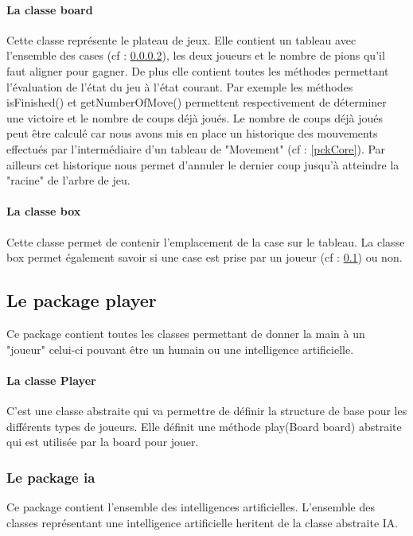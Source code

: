 \documentclass{report}
\begin{document}
                		\paragraph{La classe board}\label{classeBoard}
               			 Cette classe représente le plateau de jeux. Elle contient un tableau avec l'ensemble des cases (cf : \ref{classBox}), les deux joueurs et le nombre de pions qu'il faut aligner pour gagner.
               			 De plus elle contient toutes les méthodes permettant l'évaluation de l'état du jeu à l'état courant. Par exemple les méthodes isFinished() et getNumberOfMove() permettent respectivement de
               			 déterminer une victoire et le nombre de coups déjà joués. Le nombre de coups déjà joués peut être calculé car nous avons mis en place un historique des mouvements effectués
               			 par l'intermédiaire d'un tableau de "Movement" (cf : \ref{pckCore}).
               			 Par ailleurs cet historique nous permet d'annuler le dernier coup jusqu'à atteindre la "racine" de l'arbre de jeu.
                
                    \paragraph{La classe box} \label{classBox}

               Cette classe permet de contenir l'emplacement de la case sur le tableau.
               La classe box permet également savoir si une case est prise par un joueur (cf : \ref{pckPlayer}) ou non.

			\subsection{Le package player} \label{pckPlayer}
			Ce package contient toutes les classes permettant de donner la main à un "joueur" celui-ci pouvant être un humain ou une intelligence artificielle.

			\paragraph{La classe Player}
			C'est une classe abstraite qui va permettre de définir la structure de base pour les différents types de joueurs.
			  Elle définit une méthode play(Board board) abstraite qui est utilisée par la board pour jouer.
            \subsubsection{Le package ia}
              Ce package contient l'ensemble des intelligences artificielles. L'ensemble des classes représentant une intelligence artificielle heritent de la classe abstraite IA.
\end{document}
